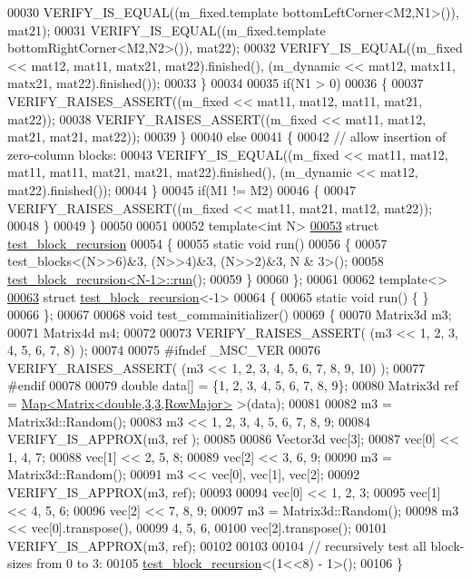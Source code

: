 \begin{DoxyCode}
00030     VERIFY\_IS\_EQUAL((m\_fixed.template bottomLeftCorner<M2,N1>()), mat21);
00031     VERIFY\_IS\_EQUAL((m\_fixed.template bottomRightCorner<M2,N2>()), mat22);
00032     VERIFY\_IS\_EQUAL((m\_fixed << mat12, mat11, matx21, mat22).finished(), (m\_dynamic << mat12, matx11, 
      matx21, mat22).finished());
00033   \}
00034 
00035   \textcolor{keywordflow}{if}(N1 > 0)
00036   \{
00037     VERIFY\_RAISES\_ASSERT((m\_fixed << mat11, mat12, mat11, mat21, mat22));
00038     VERIFY\_RAISES\_ASSERT((m\_fixed << mat11, mat12, mat21, mat21, mat22));
00039   \}
00040   \textcolor{keywordflow}{else}
00041   \{
00042     \textcolor{comment}{// allow insertion of zero-column blocks:}
00043     VERIFY\_IS\_EQUAL((m\_fixed << mat11, mat12, mat11, mat11, mat21, mat21, mat22).finished(), (m\_dynamic << 
      mat12, mat22).finished());
00044   \}
00045   \textcolor{keywordflow}{if}(M1 != M2)
00046   \{
00047     VERIFY\_RAISES\_ASSERT((m\_fixed << mat11, mat21, mat12, mat22));
00048   \}
00049 \}
00050 
00051 
00052 \textcolor{keyword}{template}<\textcolor{keywordtype}{int} N>
\hyperlink{structtest__block__recursion}{00053} \textcolor{keyword}{struct }\hyperlink{structtest__block__recursion}{test\_block\_recursion}
00054 \{
00055   \textcolor{keyword}{static} \textcolor{keywordtype}{void} run()
00056   \{
00057     test\_blocks<(N>>6)&3, (N>>4)&3, (N>>2)&3, N & 3>();
00058     \hyperlink{structtest__block__recursion}{test\_block\_recursion<N-1>::run}();
00059   \}
00060 \};
00061 
00062 \textcolor{keyword}{template}<>
\hyperlink{structtest__block__recursion_3-1_01_4}{00063} \textcolor{keyword}{struct }\hyperlink{structtest__block__recursion}{test\_block\_recursion}<-1>
00064 \{
00065   \textcolor{keyword}{static} \textcolor{keywordtype}{void} run() \{ \}
00066 \};
00067 
00068 \textcolor{keywordtype}{void} test\_commainitializer()
00069 \{
00070   Matrix3d m3;
00071   Matrix4d m4;
00072 
00073   VERIFY\_RAISES\_ASSERT( (m3 << 1, 2, 3, 4, 5, 6, 7, 8) );
00074   
00075 \textcolor{preprocessor}{  #ifndef \_MSC\_VER}
00076   VERIFY\_RAISES\_ASSERT( (m3 << 1, 2, 3, 4, 5, 6, 7, 8, 9, 10) );
00077 \textcolor{preprocessor}{  #endif}
00078 
00079   \textcolor{keywordtype}{double} data[] = \{1, 2, 3, 4, 5, 6, 7, 8, 9\};
00080   Matrix3d ref = \hyperlink{group___core___module_class_eigen_1_1_map}{Map<Matrix<double,3,3,RowMajor>} >(data);
00081 
00082   m3 = Matrix3d::Random();
00083   m3 << 1, 2, 3, 4, 5, 6, 7, 8, 9;
00084   VERIFY\_IS\_APPROX(m3, ref );
00085 
00086   Vector3d vec[3];
00087   vec[0] << 1, 4, 7;
00088   vec[1] << 2, 5, 8;
00089   vec[2] << 3, 6, 9;
00090   m3 = Matrix3d::Random();
00091   m3 << vec[0], vec[1], vec[2];
00092   VERIFY\_IS\_APPROX(m3, ref);
00093 
00094   vec[0] << 1, 2, 3;
00095   vec[1] << 4, 5, 6;
00096   vec[2] << 7, 8, 9;
00097   m3 = Matrix3d::Random();
00098   m3 << vec[0].transpose(),
00099         4, 5, 6,
00100         vec[2].transpose();
00101   VERIFY\_IS\_APPROX(m3, ref);
00102 
00103 
00104   \textcolor{comment}{// recursively test all block-sizes from 0 to 3:}
00105   \hyperlink{structtest__block__recursion}{test\_block\_recursion}<(1<<8) - 1>();
00106 \}
\end{DoxyCode}
